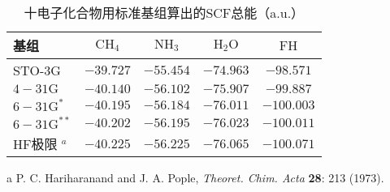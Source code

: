 \begin{table}\centering
	\caption{十电子化合物用标准基组算出的SCF总能（a.u.）}
	\begin{threeparttable}
		\begin{tabular}{lcccc}
			\hline 基组 & $\mathrm{CH}_4$ & $\mathrm{NH}_3$ & $\mathrm{H}_2 \mathrm{O}$ & $\mathrm{FH}$ \\
			\hline STO-3G & $-39.727$ & $-55.454$ & $-74.963$ & $-98.571$ \\
			$4-31 \mathrm{G}$ & $-40.140$ & $-56.102$ & $-75.907$ & $-99.887$ \\
			$6-31 \mathrm{G}^*$ & $-40.195$ & $-56.184$ & $-76.011$ & $-100.003$ \\
			$6-31 \mathrm{G}^{* *}$ & $-40.202$ & $-56.195$ & $-76.023$ & $-100.011$ \\
			HF极限\tnote{a} $^a$ & $-40.225$ & $-56.225$ & $-76.065$ & $-100.071$ \\
			\hline
		\end{tabular}
		\begin{tablenotes}
			\item[a] P. C. Hariharanand and J. A. Pople, \textit{Theoret. Chim. Acta} \textbf{28}: 213 (1973).
		\end{tablenotes}
	\end{threeparttable}
	\label{tab:3.13}
\end{table}

